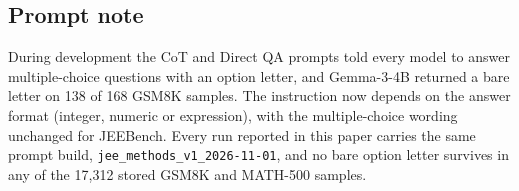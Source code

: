 \documentclass[letterpaper]{article} %
\begin{document}
\subsection{Prompt note}

During development the CoT and Direct QA prompts told every model to answer multiple-choice questions with an option letter, and Gemma-3-4B returned a bare letter on 138 of 168 GSM8K samples. The instruction now depends on the answer format (integer, numeric or expression), with the multiple-choice wording unchanged for JEEBench. Every run reported in this paper carries the same prompt build, \texttt{jee\_methods\_v1\_2026-11-01}, and no bare option letter survives in any of the 17{,}312 stored GSM8K and MATH-500 samples.
\end{document}
